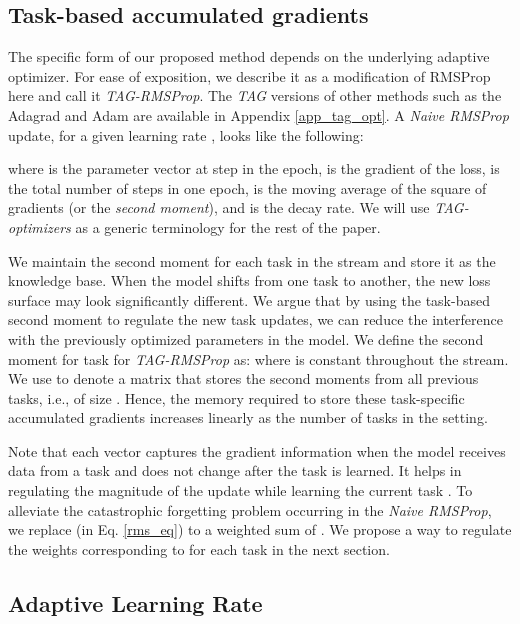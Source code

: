 \documentclass{article} \usepackage{collas2022_conference,times}
\begin{document}
\subsection{Task-based accumulated gradients}\label{tag_def_section}
The specific form of our proposed method depends on the underlying adaptive optimizer. For ease of exposition, we describe it as a modification of RMSProp \citep{rmsprop} here and call it \textit{TAG-RMSProp}. The \textit{TAG} versions of other methods such as the Adagrad \citep{duchi2011adaptive} and Adam are available in Appendix \ref{app_tag_opt}. A \textit{Naive RMSProp} update, for a given learning rate , looks like the following:
     
    where  is the parameter vector at step  in the epoch,  is the gradient of the loss,  is the total number of steps in one epoch,  is the moving average of the square of gradients (or the \textit{second moment}), and  is the decay rate. We will use \textit{TAG-optimizers} as a generic terminology for the rest of the paper. 
    
    We maintain the second moment  for each task  in the stream and store it as the knowledge base. When the model shifts from one task to another, the new loss surface may look significantly different. We argue that by using the task-based second moment to regulate the new task updates, we can reduce the interference with the previously optimized parameters in the model. 
We define the second moment  for task  for \textit{TAG-RMSProp} as:
  where  is constant throughout the stream. We use  to denote a matrix that stores the second moments from all previous tasks, i.e.,  of size . Hence, the memory required to store these task-specific accumulated gradients increases linearly as the number of tasks in the setting. 


    Note that each  vector captures the gradient information when the model receives data from a task  and does not change after the task  is learned. It helps in regulating the magnitude of the update while learning the current task . 
To alleviate the catastrophic forgetting problem occurring in the \textit{Naive RMSProp}, we replace  (in Eq. \ref{rms_eq}) to a weighted sum of . We propose a way to regulate the weights corresponding to  for each task in the next section. 


\subsection{Adaptive Learning Rate}\label{alpha_sec}
\end{document}
